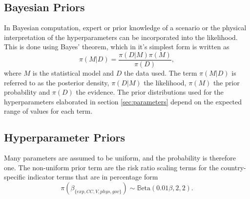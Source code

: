 \documentclass[10pt,a4paper]{article}
\begin{document}
\begin{multicols}{1}
\subsection{Bayesian Priors}\label{sec:priors}
In Bayesian computation, expert or prior knowledge of a scenario or the physical interpretation of the hyperparameters can be incorporated into the likelihood. This is done using Bayes' theorem, which in it's simplest form is written as
\begin{equation}\label{eq:bayes}
  \pi(M|D)=\frac{\pi(D|M)\pi(M)}{\pi(D)},
\end{equation}
where $M$ is the statistical model and $D$ the data used. The term $\pi(M|D)$ is referred to as the posterior density, $\pi(D|M)$ the likelihood, $\pi(M)$ the prior probability and $\pi(D)$ the evidence. The prior distributions used for the hyperparameters elaborated in section \ref{sec:parameters} depend on the expected range of values for each term.
\subsection{Hyperparameter Priors}\label{sec:hyperpriors}
Many parameters are assumed to be uniform, and the probability is therefore one. The non-uniform prior term are the risk ratio scaling terms for the country-specific indicator terms that are in percentage form
\begin{equation}\label{eq:priorbeta}
  \pi(\beta_{\{exp, CC, V, phys, gov\}})\sim\mathbb{B}\text{eta}(0.01\beta,2,2).
\end{equation}

\end{multicols}
\end{document}
